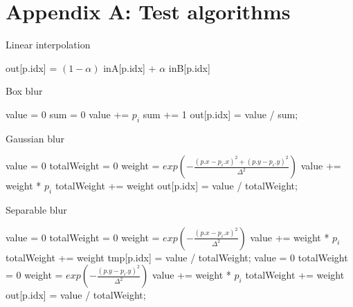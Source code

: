 \section*{Appendix A: Test algorithms}

\begin{algorithm}
\caption{Linear interpolation}
\begin{algorithmic}
\STATE out[p.idx] = $(1-\alpha)$ inA[p.idx] + $\alpha$ inB[p.idx]
\ENDFOR
\end{algorithmic}
\label{lerp}
\end{algorithm}

\begin{algorithm}
\caption{Box blur}
\begin{algorithmic}
\STATE value = 0
\STATE sum = 0
\STATE value += $p_i$
\STATE sum += 1
\ENDFOR
\STATE out[p.idx] = value / sum;
\ENDFOR
\end{algorithmic}
\label{boxblur}
\end{algorithm}

\begin{algorithm}
\caption{Gaussian blur}
\begin{algorithmic}
\STATE value = 0
\STATE totalWeight = 0
\STATE weight = $exp(-\frac{{(p.x-p_i.x)}^2 + {(p.y-p_i.y)}^2}{\Delta^2})$
\STATE value += weight * $p_i$
\STATE totalWeight += weight
\ENDFOR
\STATE out[p.idx] = value / totalWeight;
\ENDFOR
\end{algorithmic}
\label{gaussianblur}
\end{algorithm}

\begin{algorithm}
\caption{Separable blur}
\begin{algorithmic}
\STATE value = 0
\STATE totalWeight = 0
\STATE weight = $exp(-\frac{{(p.x-p_i.x)}^2}{\Delta^2})$
\STATE value += weight * $p_i$
\STATE totalWeight += weight
\ENDFOR
\STATE tmp[p.idx] = value / totalWeight;
\ENDFOR
{}
\STATE value = 0
\STATE totalWeight = 0
\STATE weight = $exp(-\frac{{(p.y-p_i.y)}^2}{\Delta^2})$
\STATE value += weight * $p_i$
\STATE totalWeight += weight
\ENDFOR
\STATE out[p.idx] = value / totalWeight;
\ENDFOR
\end{algorithmic}
\label{gaussianblur}
\end{algorithm}

